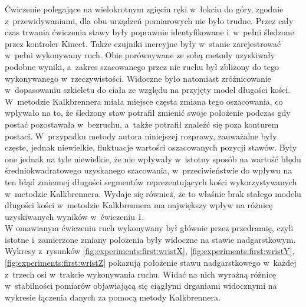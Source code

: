 Ćwiczenie polegające na wielokrotnym zgięciu ręki w~łokciu do góry, zgodnie z~przewidywaniami, dla obu urządzeń pomiarowych nie było trudne. Przez cały czas trwania ćwiczenia stawy były poprawnie identyfikowane i~w~pełni śledzone przez kontroler Kinect. Także czujniki inercyjne były w~stanie zarejestrować w~pełni  wykonywany ruch. Obie porównywane ze sobą metody uzyskiwały podobne wyniki, a~zakres szacowanego przez nie ruchu był zbliżony do tego wykonywanego w~rzeczywistości. Widoczne było natomiast zróżnicowanie w~dopasowaniu szkieletu do ciała ze względu na przyjęty model długości kości. W~metodzie Kalkbrennera miała miejsce częsta zmiana tego oszacowania, co wpływało na to, że śledzony staw potrafił zmienić swoje położenie podczas gdy postać pozostawała w~bezruchu, a~także potrafił znaleźć się poza konturem postaci. W~przypadku metody autora niniejszej rozprawy, zauważalne były częste, jednak niewielkie, fluktuacje wartości oszacowanych pozycji stawów. Były one jednak na tyle niewielkie, że nie wpływały w~istotny sposób na wartość błędu średniokwadratowego uzyskanego szacowania, w~przeciwieństwie do wpływu na ten błąd zmiennej długości segmentów reprezentujących kości wykorzystywanych w~metodzie Kalkbrennera. Wydaje się również, że to właśnie brak stałego modelu długości kości w~metodzie Kalkbrennera ma największy wpływ na różnicę uzyskiwanych wyników w~ćwiczeniu 1. \\
						
W omawianym ćwiczeniu ruch wykonywany był głównie przez przedramię, czyli istotne i~zamierzone zmiany położenia były widoczne na stawie nadgarstkowym. Wykresy z~rysunków \ref{fig:experiments:first:wristX}, \ref{fig:experiments:first:wristY}, \ref{fig:experiments:first:wristZ} pokazują położenie stawu nadgarstkowego w~każdej z~trzech osi w~trakcie wykonywania ruchu. Widać na nich wyraźną różnicę w~stabilności pomiarów objawiającą się ciągłymi drganiami widocznymi na wykresie łączenia danych za pomocą metody Kalkbrennera.
					
